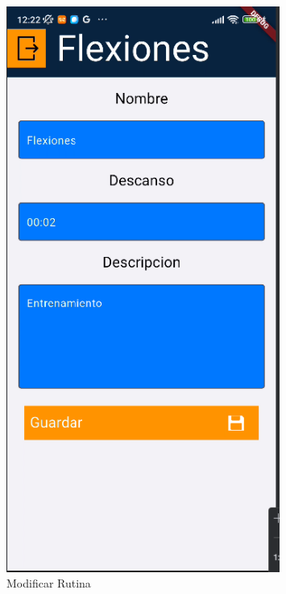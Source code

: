 \begin{figure}[H]
   \centering
    \includegraphics[width=0.8\textwidth]{pantallas/modRutina.png}
    \caption{Modificar Rutina}
    \label{fig:modRutina}
\end{figure}

